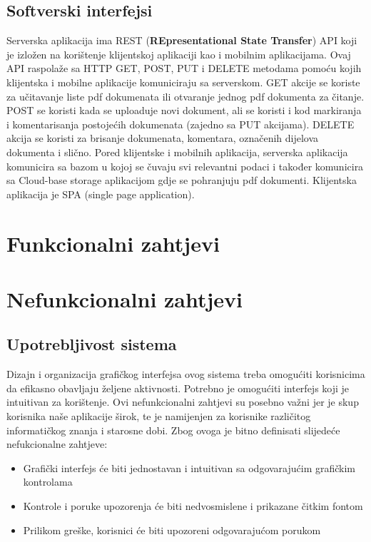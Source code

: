 \subsection{Softverski interfejsi}
Serverska aplikacija ima REST (\textbf{REpresentational State Transfer})  API koji je izložen na korištenje klijentskoj aplikaciji kao i mobilnim aplikacijama. Ovaj API raspolaže sa HTTP GET, POST, PUT i DELETE metodama pomoću kojih klijentska i  mobilne aplikacije komuniciraju sa serverskom. GET akcije se koriste za učitavanje liste pdf dokumenata ili otvaranje jednog pdf dokumenta za čitanje. POST  se koristi kada se uploaduje novi dokument, ali se koristi i kod markiranja i komentarisanja postojećih dokumenata (zajedno sa PUT akcijama). DELETE akcija se koristi za brisanje dokumenata, komentara, označenih dijelova dokumenta i slično. Pored klijentske i mobilnih aplikacija, serverska aplikacija komunicira sa bazom u kojoj se čuvaju  svi relevantni podaci i također komunicira sa Cloud-base storage aplikacijom gdje se pohranjuju pdf dokumenti. Klijentska aplikacija je SPA (single page application). 

\section{Funkcionalni zahtjevi}



\section{Nefunkcionalni zahtjevi}
\subsection{Upotrebljivost sistema}
Dizajn i organizacija grafičkog interfejsa ovog sistema treba omogućiti korisnicima da efikasno obavljaju željene aktivnosti. Potrebno je omogućiti interfejs koji je intuitivan za korištenje. Ovi nefunkcionalni zahtjevi su posebno važni jer je skup korisnika naše aplikacije širok, te je namijenjen za korisnike različitog informatičkog znanja i starosne dobi. Zbog ovoga je bitno definisati slijedeće nefukcionalne zahtjeve:
\begin{itemize}
    \item Grafički interfejs će biti jednostavan i intuitivan sa odgovarajućim grafičkim kontrolama
    \item Kontrole i poruke upozorenja će biti nedvosmislene i prikazane čitkim fontom 
    \item Prilikom greške, korisnici će biti upozoreni odgovarajućom porukom
\end{itemize}


